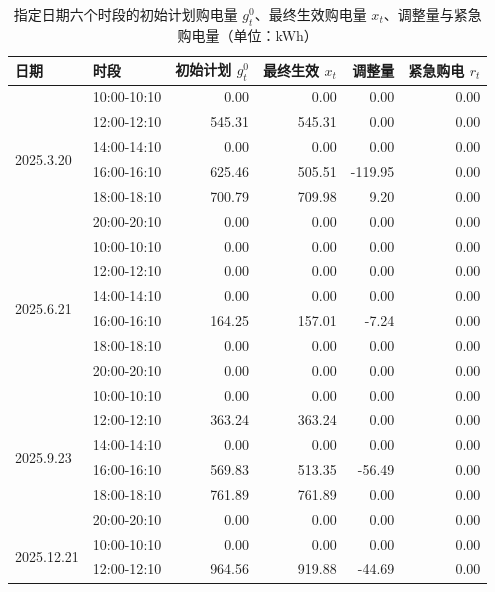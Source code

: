 
\begin{table}[htbp]
  \centering
  \caption{指定日期六个时段的初始计划购电量 $g^0_t$、最终生效购电量 $x_t$、调整量与紧急购电量（单位：kWh）}
  \label{tab:p3-buy}
  \scriptsize
  \begin{tabular}{llrrrr}
    \toprule
    日期 & 时段 & 初始计划 $g^0_t$ & 最终生效 $x_t$ & 调整量 & 紧急购电 $r_t$ \\
    \midrule
    \multirow{6}{*}{2025.3.20} & 10{:}00-10{:}10 & 0.00 & 0.00 & 0.00 & 0.00 \\
     & 12{:}00-12{:}10 & 545.31 & 545.31 & 0.00 & 0.00 \\
     & 14{:}00-14{:}10 & 0.00 & 0.00 & 0.00 & 0.00 \\
     & 16{:}00-16{:}10 & 625.46 & 505.51 & -119.95 & 0.00 \\
     & 18{:}00-18{:}10 & 700.79 & 709.98 & 9.20 & 0.00 \\
     & 20{:}00-20{:}10 & 0.00 & 0.00 & 0.00 & 0.00 \\
    \midrule
    \multirow{6}{*}{2025.6.21} & 10{:}00-10{:}10 & 0.00 & 0.00 & 0.00 & 0.00 \\
     & 12{:}00-12{:}10 & 0.00 & 0.00 & 0.00 & 0.00 \\
     & 14{:}00-14{:}10 & 0.00 & 0.00 & 0.00 & 0.00 \\
     & 16{:}00-16{:}10 & 164.25 & 157.01 & -7.24 & 0.00 \\
     & 18{:}00-18{:}10 & 0.00 & 0.00 & 0.00 & 0.00 \\
     & 20{:}00-20{:}10 & 0.00 & 0.00 & 0.00 & 0.00 \\
    \midrule
    \multirow{6}{*}{2025.9.23} & 10{:}00-10{:}10 & 0.00 & 0.00 & 0.00 & 0.00 \\
     & 12{:}00-12{:}10 & 363.24 & 363.24 & 0.00 & 0.00 \\
     & 14{:}00-14{:}10 & 0.00 & 0.00 & 0.00 & 0.00 \\
     & 16{:}00-16{:}10 & 569.83 & 513.35 & -56.49 & 0.00 \\
     & 18{:}00-18{:}10 & 761.89 & 761.89 & 0.00 & 0.00 \\
     & 20{:}00-20{:}10 & 0.00 & 0.00 & 0.00 & 0.00 \\
    \midrule
    \multirow{6}{*}{2025.12.21} & 10{:}00-10{:}10 & 0.00 & 0.00 & 0.00 & 0.00 \\
     & 12{:}00-12{:}10 & 964.56 & 919.88 & -44.69 & 0.00 \\

\end{tabular}
\end{table}
